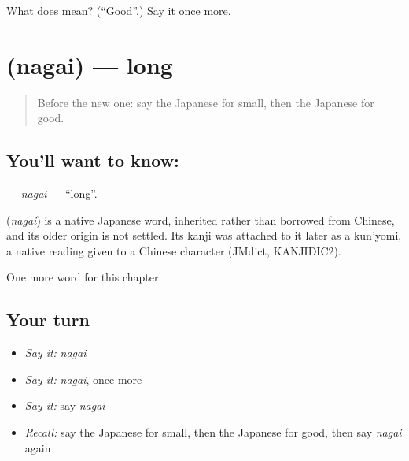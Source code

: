 \begin{tcolorbox}[breakable,colback=teal!4,colframe=teal!35!black,title={Before you move on}]
What does  mean? (\textquotedblleft{}Good\textquotedblright{}.) Say it once more.
\end{tcolorbox}
\section[\texorpdfstring{\ja{ながい} (nagai)}{ながい (nagai)}]{ (nagai) — long}

\label{lesson:JA-C48-nagai}



\begin{quote}
Before the new one: say the Japanese for small, then the Japanese for good.
\end{quote}

\subsection*{You'll want to know: }
\textbf{} — \emph{nagai} — \textquotedblleft{}long\textquotedblright{}.

\begin{cousinweb}
\textbf{} (\emph{nagai}) is a native Japanese word, inherited rather than borrowed from Chinese, and its older origin is not settled. Its kanji was attached to it later as a kun'yomi, a native reading given to a Chinese character (JMdict, KANJIDIC2).
\end{cousinweb}

\begin{grammarlens}[title={What you've built}]
One more word for this chapter.
\end{grammarlens}

\subsection*{Your turn}
\begin{itemize}
\raggedright
  \item \emph{Say it:} \emph{nagai}
  \item \emph{Say it:} \emph{nagai}, once more
  \item \emph{Say it:} say \emph{nagai}
  \item \emph{Recall:} say the Japanese for small, then the Japanese for good, then say \emph{nagai} again
\end{itemize}

